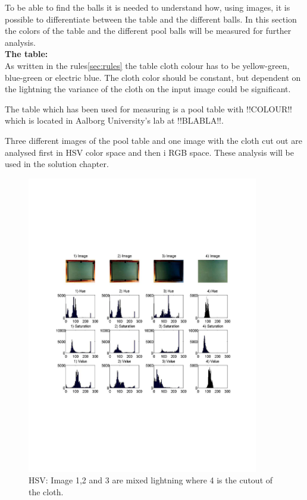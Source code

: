 To be able to find the balls it is needed to understand how, using images, it is possible to differentiate between the table and the different balls. In this section the colors of the table and the different pool balls will be measured for further analysis.\\

\textbf{The table:}\\
As written in the rules\ref{sec:rules} the table cloth colour has to be yellow-green, blue-green or electric blue. The cloth color should be constant, but dependent on the lightning the variance of the cloth on the input image could be significant.

The table which has been used for measuring is a pool table with !!COLOUR!! which is located in Aalborg University's lab at !!BLABLA!!. 

Three different images of the pool table and one image with the cloth cut out are analysed first in HSV color space and then i RGB space. These analysis will be used in the solution chapter.

\begin{figure}[H]
\begin{center}
\leavevmode
\includegraphics[width=0.9\textwidth]{images/table_hist_hsv.pdf}
\end{center}
\caption{HSV: Image 1,2 and 3 are mixed lightning where 4 is the cutout of the cloth.}
\label{fig:tablehsv}
\end{figure}

